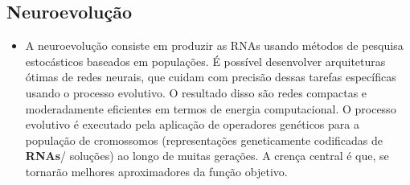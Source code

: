 \subsection{\textbf{Neuroevolução}}
\begin{itemize}
    \item A neuroevolução consiste em produzir as RNAs usando métodos de pesquisa estocásticos baseados em populações. É possível desenvolver arquiteturas ótimas de redes neurais, que cuidam com precisão dessas  tarefas específicas usando o processo evolutivo.
O resultado disso são redes compactas e moderadamente eficientes em termos de energia computacional. O processo evolutivo é executado pela aplicação de operadores genéticos para a população de cromossomos (representações geneticamente codificadas de \textbf{RNAs}/ soluções) ao longo de muitas gerações. A crença central é que, se tornarão melhores aproximadores da função objetivo.\cite{neuroevolucao}
\end{itemize}

%
%
